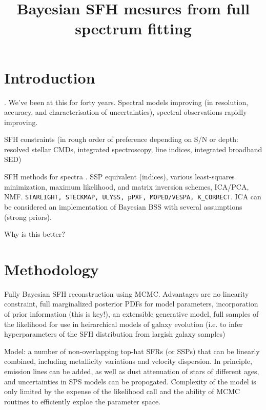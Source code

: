 \title{Bayesian SFH mesures from full spectrum fitting}


\section{Introduction}
\citet{tinsley68}.  We've been at this for forty years. Spectral models improving (in resolution, accuracy, and characterisation of uncertainties), spectral observations rapidly improving.

SFH constraints (in rough order of preference depending on S/N or depth: resolved stellar CMDs, integrated spectroscopy, line indices, integrated broadband SED)

SFH methods for spectra \citep{walcher2011}.  SSP equivalent (indices), various least-squares minimization, maximum likelihood, and matrix inversion schemes, ICA/PCA, NMF. \texttt{STARLIGHT, STECKMAP, ULYSS, pPXF, MOPED/VESPA, K_CORRECT}. ICA can be considered an implementation of Bayesian BSS with several assumptions (strong priors).

Why is this better? 

\section{Methodology}
Fully Bayesian SFH reconstruction using MCMC.  Advantages are no linearity constraint, full marginalized posterior PDFs for model parameters, incorporation of prior information (this is key!), an extensible generative model, full samples of the likelihood for use in heirarchical models of galaxy evolution (i.e. to infer hyperparameters of the SFH distribution from largish galaxy samples)

Model:  a number of non-overlapping top-hat SFRs (or SSPs) that can be linearly combined, including metallicity variations and velocity dispersion.  In principle, emission lines can be added, as well as dust attenuation of stars of different ages, and uncertainties in SPS models can be propogated.  Complexity of the model is only limited by the expense of the likelihood call and the ability of MCMC routines to efficiently exploe the parameter space.

